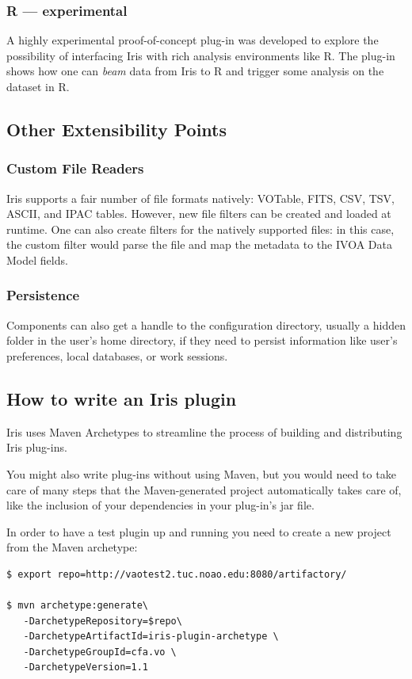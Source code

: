 \documentclass[final,5p]{elsarticle}
\begin{document}
\subsubsection{R --- experimental}
A highly experimental proof-of-concept plug-in was developed to explore the possibility of interfacing Iris with rich analysis environments like R. The plug-in shows how one can \emph{beam} data from Iris to R and trigger some analysis on the dataset in R.


\subsection{Other Extensibility Points}

\subsubsection{Custom File Readers}
Iris supports a fair number of {fi}le formats natively: VOTable,
FITS, CSV, TSV, ASCII, and IPAC tables. However, new {fi}le {fi}lters can be created and
loaded at runtime. One can also create {fi}lters for the natively supported {fi}les: in this
case, the custom {fi}lter would parse the {fi}le and map the metadata to the IVOA Data
Model {fi}elds.

\subsubsection{Persistence}
Components can also get a handle to the configuration directory, usually a hidden folder in the user's home directory, if they need to persist information like user's preferences, local databases, or work sessions.



\subsection{How to write an Iris plugin}
\label{sec:writeplugin}
Iris uses Maven Archetypes to streamline the process of building and distributing Iris plug-ins.

You might also write plug-ins without using Maven, but you would need to take care of many steps that the Maven-generated project automatically takes care of, like the inclusion of your dependencies in your plug-in's jar file.

In order to have a test plugin up and running you need to create a new project from the Maven archetype:

\begin{lstlisting}[style=code]
$ export repo=http://vaotest2.tuc.noao.edu:8080/artifactory/

$ mvn archetype:generate\
   -DarchetypeRepository=$repo\
   -DarchetypeArtifactId=iris-plugin-archetype \
   -DarchetypeGroupId=cfa.vo \
   -DarchetypeVersion=1.1
\end{lstlisting}
\end{document}

